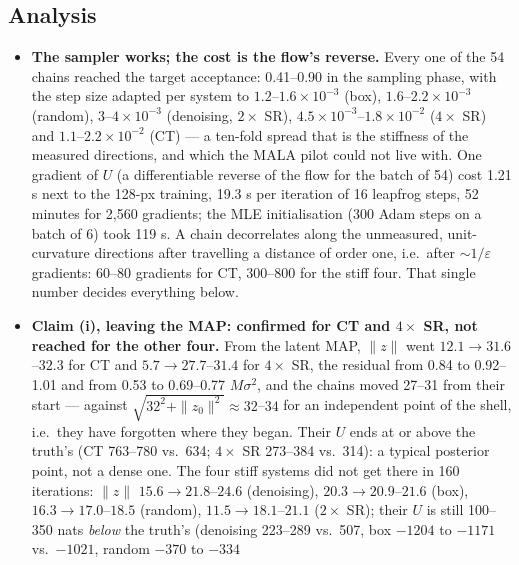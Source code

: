 \documentclass[11pt]{article}
\begin{document}
\subsection{Analysis}
\label{sec:step16analysis}
\begin{itemize}
  \item \textbf{The sampler works; the cost is the flow's reverse.} Every
        one of the 54 chains reached the target acceptance: 0.41--0.90 in
        the sampling phase, with the step size adapted per system to
        $1.2$--$1.6 \times 10^{-3}$ (box), $1.6$--$2.2 \times 10^{-3}$
        (random), $3$--$4 \times 10^{-3}$ (denoising, $2\times$ SR),
        $4.5 \times 10^{-3}$--$1.8 \times 10^{-2}$ ($4\times$ SR) and
        $1.1$--$2.2 \times 10^{-2}$ (CT) --- a ten-fold spread that is the
        stiffness of the measured directions, and which the MALA pilot
        could not live with. One gradient of $U$ (a differentiable
        reverse of the flow for the batch of 54) cost 1.21 s next to the
        128-px training, 19.3 s per iteration of 16 leapfrog steps, 52
        minutes for 2,560 gradients; the MLE initialisation (300 Adam
        steps on a batch of 6) took 119 s. A chain decorrelates along the
        unmeasured, unit-curvature directions after travelling a distance
        of order one, i.e.\ after $\sim 1/\varepsilon$ gradients: 60--80
        gradients for CT, 300--800 for the stiff four. That single number
        decides everything below.
  \item \textbf{Claim (i), leaving the MAP: confirmed for CT and $4\times$
        SR, not reached for the other four.} From the latent MAP, $\|z\|$
        went $12.1 \to 31.6$--$32.3$ for CT and $5.7 \to 27.7$--$31.4$ for
        $4\times$ SR, the residual from 0.84 to 0.92--1.01 and from 0.53 to
        0.69--0.77 $M\sigma^2$, and the chains moved 27--31 from their
        start --- against $\sqrt{32^2 + \|z_0\|^2} \approx 32$--$34$ for an
        independent point of the shell, i.e.\ they have forgotten where
        they began. Their $U$ ends at or above the truth's (CT 763--780
        vs.\ 634; $4\times$ SR 273--384 vs.\ 314): a typical posterior
        point, not a dense one. The four stiff systems did not get there
        in 160 iterations: $\|z\|$ $15.6 \to 21.8$--$24.6$ (denoising),
        $20.3 \to 20.9$--$21.6$ (box), $16.3 \to 17.0$--$18.5$ (random),
        $11.5 \to 18.1$--$21.1$ ($2\times$ SR); their $U$ is still
        100--350 nats \emph{below} the truth's (denoising 223--289 vs.\
        507, box $-1204$ to $-1171$ vs.\ $-1021$, random $-370$ to $-334$

\end{itemize}
\end{document}
